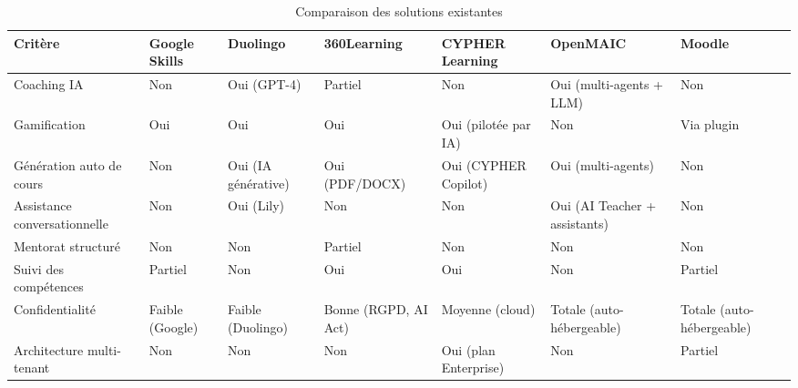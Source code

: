 \begin{table}[H]
\centering
\caption{Comparaison des solutions existantes}
\label{tab:comparaison}

\setlength{\tabcolsep}{5pt}
\renewcommand{\arraystretch}{1.25}
\footnotesize

\begin{tabular}{|p{2.5cm}|p{1.9cm}|p{1.9cm}|p{1.9cm}|p{1.9cm}|p{2cm}|p{1.9cm}|}

\hline

\textbf{Critère} 
& \textbf{Google Skills} 
& \textbf{Duolingo} 
& \textbf{360Learning} 
& \textbf{CYPHER Learning}
& \textbf{OpenMAIC}
& \textbf{Moodle} \\

\hline

Coaching IA 
& Non 
& Oui (GPT-4) 
& Partiel 
& Non  
& Oui (multi-agents + LLM)
& Non \\

\hline

Gamification 
& Oui 
& Oui 
& Oui 
& Oui (pilotée par IA) 
& Non 
& Via plugin \\

\hline

Génération auto de cours 
& Non 
& Oui (IA générative) 
& Oui (PDF/DOCX) 
& Oui (CYPHER Copilot) 
& Oui (multi-agents)
& Non \\

\hline

Assistance conversationnelle 
& Non 
& Oui (Lily) 
& Non 
& Non 
& Oui (AI Teacher + assistants)
& Non \\

\hline

Mentorat structuré 
& Non 
& Non 
& Partiel 
& Non  
& Non
& Non \\

\hline

Suivi des compétences 
& Partiel 
& Non 
& Oui 
& Oui 
& Non
& Partiel \\

\hline

Confidentialité 
& Faible (Google) 
& Faible (Duolingo) 
& Bonne (RGPD, AI Act) 
& Moyenne (cloud)  
& Totale (auto-hébergeable)
& Totale (auto-hébergeable) \\

\hline

Architecture multi-tenant 
& Non 
& Non 
& Non 
& Oui (plan Enterprise) 
& Non
& Partiel \\

\hline


\end{tabular}
\end{table}

